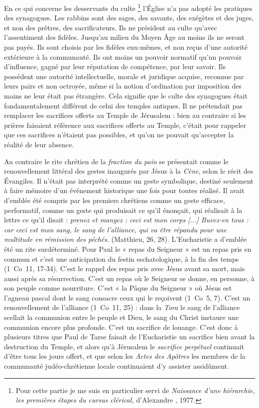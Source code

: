  En ce qui concerne les desservants du culte%
\footnote{Pour cette partie je me suis en particulier servi de \emph{Naissance d'une hiérarchie, les premières étapes du cursus clérical,} d'Alexandre , 1977.}
l'Église n'a pas adopté les pratiques des synagogues. Les rabbins sont des sages, des savants, des exégètes et des juges, et non des prêtres, des sacrificateurs. Ils ne président au culte qu'avec l'assentiment des fidèles. Jusqu'au milieu du Moyen Âge au moins ils ne seront pas payés. Ils sont choisis par les fidèles eux-mêmes, et non reçus d'une autorité extérieure à la communauté. Ils ont moins un pouvoir normatif qu'un pouvoir d'influence, gagné par leur réputation de compétence, par leur savoir. Ils possèdent une autorité intellectuelle, morale et juridique acquise, reconnue par leurs pairs et non octroyée, même si la notion d'ordination par imposition des mains ne leur était pas étrangère. Cela signifie que le culte des synagogues était fondamentalement différent de celui des temples antiques. Il ne prétendait pas remplacer les sacrifices offerts au Temple de Jérusalem : bien au contraire si les prières faisaient référence aux sacrifices offerts au Temple, c'était pour rappeler que ces sacrifices n'étaient pas possibles, et qu'on ne pouvait qu'accepter la réalité de leur absence. 

 Au contraire le rite chrétien de la \emph{fraction du pain} se présentait comme le renouvellement littéral des gestes inaugurés par Jésus à la \emph{Cène}, selon le récit des Évangiles. Il n'était pas interprété comme un geste symbolique, destiné seulement à faire mémoire d'un événement historique une fois pour toutes réalisé. Il avait d'emblée été compris par les premiers chrétiens comme un geste efficace, performatif, comme un geste qui produisait ce qu'il énonçait, qui réalisait à la lettre ce qu'il disait : \emph{prenez et mangez : ceci est mon corps \emph{[...]} Buvez-en tous : car ceci est mon sang, le sang de l'alliance, qui va être répandu pour une multitude en rémission des péchés}. (Matthieu, 26, 28). L'Eucharistie a d'emblée été un rite surdéterminé. Pour Paul le « repas du Seigneur » est un repas pris en commun et c'est une anticipation du festin eschatologique, à la fin des temps (1~Co~11, 17-34). C'est le rappel des repas pris avec Jésus avant sa mort, mais aussi après sa résurrection. C'est un repas où le Seigneur se donne, en personne, à son peuple comme nourriture. C'est « la Pâque du Seigneur » où Jésus est l'agneau pascal dont le sang consacre ceux qui le reçoivent (1~Co~5, 7). C'est un renouvellement de l'alliance (1~Co~11, 25) : dans la \emph{Tora} le sang de l'alliance scellait la communion entre le peuple et Dieu, le sang du Christ instaure une communion encore plus profonde. C'est un sacrifice de louange. C'est donc à plusieurs titres que Paul de Tarse faisait de l'Eucharistie un sacrifice bien avant la destruction du Temple, et alors qu'à Jérusalem le \emph{sacrifice perpétuel} continuait d'être tous les jours offert, et que selon les \emph{Actes des Apôtres} les membres de la communauté judéo-chrétienne locale continuaient d'y assister assidûment.

